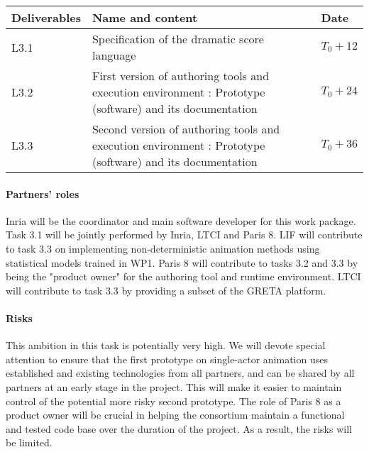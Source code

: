 \begin{tabular}{|l|p{10cm}|l|}\hline
Deliverables & Name and content  & Date  \\\hline
L3.1  & Specification of the dramatic score language &  $T_0+12$   \\\hline
L3.2  & First version of authoring tools and execution environment : Prototype (software) and its documentation &  $T_0+24$  \\\hline
L3.3  & Second version of authoring tools and execution environment : Prototype (software) and its documentation &  $T_0+36$   \\\hline
\end{tabular}

\paragraph{Partners' roles}
Inria will be the coordinator and main software developer for this work package.  Task 3.1 will be jointly performed by Inria, LTCI and Paris 8.
LIF will contribute to task 3.3 on implementing non-deterministic animation  methods using statistical models trained in WP1. Paris 8 will contribute 
to tasks 3.2 and 3.3 by being the "product owner" for the authoring tool and runtime environment. LTCI will contribute to task   3.3 by providing a subset 
of the GRETA platform.

\paragraph{Risks}
This ambition in this task is potentially very high. We will devote special attention to  ensure that the first prototype on single-actor animation 
uses established and existing  technologies from all partners, and can be shared by all partners at an early stage in the project. This will make
it easier to maintain control of the potential more risky second prototype. The role of Paris 8 as a product owner will be crucial in helping the 
consortium maintain a functional and tested code base over the duration of the project. As a result, the risks will be limited.

\endinput
